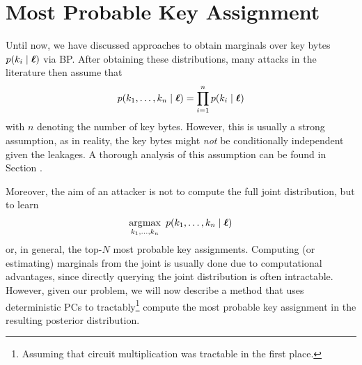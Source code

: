 \section{Most Probable Key Assignment}
\label{sec:mpe}
Until now, we have discussed approaches to obtain marginals over key bytes $p(k_i \mid \boldsymbol{\ell})$ via BP.
After obtaining these distributions, many attacks in the literature \cite{5min, 32bit} then assume that
\begin{align}
    p(k_1,\dots,k_n \mid \boldsymbol{\ell}) = \prod_{i=1}^n p(k_i \mid \boldsymbol{\ell})
\end{align}
with $n$ denoting the number of key bytes.
However, this is usually a strong assumption, as in reality, the key bytes might \emph{not} be conditionally independent given the leakages. A thorough analysis of this assumption can be found in Section \label{sec:mar_vs_mpe}.

Moreover, the aim of an attacker is not to compute the full joint distribution, but to learn
\begin{align}
    \operatorname*{\arg\!\max}_{k_1,\dots,k_n} \ p(k_1,\dots,k_n \mid \boldsymbol{\ell})
\end{align}
or, in general, the top-$N$ most probable key assignments. Computing (or estimating) marginals from the joint is usually done due to computational advantages, since directly querying the joint distribution is often intractable. 
However, given our problem, we will now describe a method that uses deterministic PCs to tractably\footnote{Assuming that circuit multiplication was tractable in the first place.} compute the most probable key assignment in the resulting posterior distribution.

